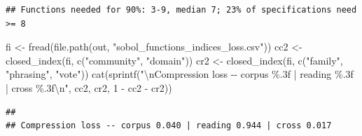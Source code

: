 \documentclass[
  11pt,
]{article}
\newenvironment{Shaded}{\begin{snugshade}}{\end{snugshade}}
\newcommand{\DecValTok}[1]{\textcolor[rgb]{0.00,0.00,0.81}{#1}}
\newcommand{\FunctionTok}[1]{\textcolor[rgb]{0.00,0.00,0.00}{#1}}
\newcommand{\NormalTok}[1]{#1}
\newcommand{\OtherTok}[1]{\textcolor[rgb]{0.56,0.35,0.01}{#1}}
\newcommand{\SpecialCharTok}[1]{\textcolor[rgb]{0.00,0.00,0.00}{#1}}
\newcommand{\StringTok}[1]{\textcolor[rgb]{0.31,0.60,0.02}{#1}}
\begin{document}
\begin{Shaded}
\end{Shaded}

\begin{verbatim}
## Functions needed for 90%: 3-9, median 7; 23% of specifications need >= 8
\end{verbatim}

\begin{Shaded}
\begin{Highlighting}[]
\NormalTok{fi }\OtherTok{\textless{}{-}} \FunctionTok{fread}\NormalTok{(}\FunctionTok{file.path}\NormalTok{(out, }\StringTok{"sobol\_functions\_indices\_loss.csv"}\NormalTok{))}
\NormalTok{cc2 }\OtherTok{\textless{}{-}} \FunctionTok{closed\_index}\NormalTok{(fi, }\FunctionTok{c}\NormalTok{(}\StringTok{"community"}\NormalTok{, }\StringTok{"domain"}\NormalTok{))}
\NormalTok{cr2 }\OtherTok{\textless{}{-}} \FunctionTok{closed\_index}\NormalTok{(fi, }\FunctionTok{c}\NormalTok{(}\StringTok{"family"}\NormalTok{, }\StringTok{"phrasing"}\NormalTok{, }\StringTok{"vote"}\NormalTok{))}
\FunctionTok{cat}\NormalTok{(}\FunctionTok{sprintf}\NormalTok{(}\StringTok{"}\SpecialCharTok{\textbackslash{}n}\StringTok{Compression loss {-}{-} corpus \%.3f | reading \%.3f | cross \%.3f}\SpecialCharTok{\textbackslash{}n}\StringTok{"}\NormalTok{,}
\NormalTok{            cc2, cr2, }\DecValTok{1} \SpecialCharTok{{-}}\NormalTok{ cc2 }\SpecialCharTok{{-}}\NormalTok{ cr2))}
\end{Highlighting}
\end{Shaded}

\begin{verbatim}
## 
## Compression loss -- corpus 0.040 | reading 0.944 | cross 0.017
\end{verbatim}
\end{document}
